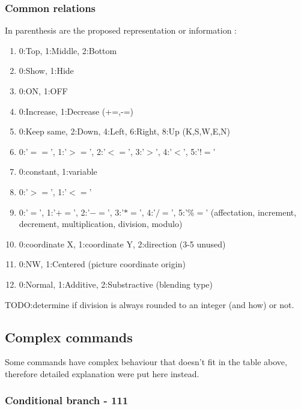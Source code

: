 \documentclass[11pt]{article}
\begin{document}

\newpage
\subsubsection{Common relations}

In parenthesis are the proposed representation or information :
\begin{enumerate}
	\item 0:Top, 1:Middle, 2:Bottom
	\item 0:Show, 1:Hide
	\item 0:ON, 1:OFF
	\item 0:Increase, 1:Decrease (+=,-=)
	\item 0:Keep same, 2:Down, 4:Left, 6:Right, 8:Up (K,S,W,E,N)
	\item 0:'$==$', 1:'$>=$', 2:'$<=$', 3:'$>$', 4:'$<$', 5:'$!=$'
	\item 0:constant, 1:variable
	\item 0:'$>=$', 1:'$<=$'
	\item 0:'$=$', 1:'$+=$', 2:'$-=$', 3:'$*=$', 4:'$/=$', 5:'$\%=$' (affectation, increment, decrement, multiplication, division, modulo)
	\item 0:coordinate X, 1:coordinate Y, 2:direction (3-5 unused)
	\item 0:NW, 1:Centered (picture coordinate origin)
	\item 0:Normal, 1:Additive, 2:Substractive (blending type)
\end{enumerate}

TODO:determine if division is always rounded to an integer (and how) or not.


\subsection{Complex commands}

Some commands have complex behaviour that doesn't fit in the table above, therefore detailed explanation were put here instead.


\subsubsection{Conditional branch - 111}
\label{sec:condbranch}
\end{document}
